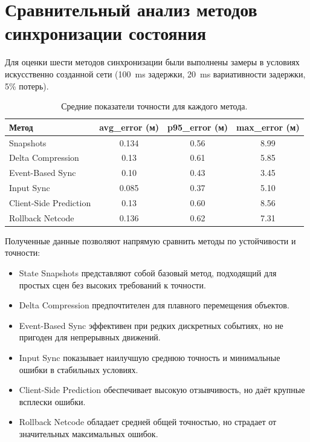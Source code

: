 \chapter{Сравнительный анализ методов синхронизации состояния}

Для оценки шести методов синхронизации были выполнены замеры в условиях
искусственно созданной сети (100~ms задержки, 20~ms вариативности задержки, 5\% потерь).

\begin{table}[h!]
    \centering
    \renewcommand{\arraystretch}{1.2}
    \begin{tabular}{|p{3.2cm}|c|c|c|}
        \hline
        Метод &
        avg\_error (м) &
        p95\_error (м) &
        max\_error (м) \\ \hline

        Snapshots &
        0.134 &
        0.56 &
        8.99 \\ \hline

        Delta Compression &
        0.13 &
        0.61 &
        5.85 \\ \hline

        Event-Based Sync &
        0.10 &
        0.43 &
        3.45 \\ \hline

        Input Sync &
        0.085 &
        0.37 &
        5.10 \\ \hline

        Client-Side Prediction &
        0.13 &
        0.60 &
        8.56 \\ \hline

        Rollback Netcode &
        0.136 &
        0.62 &
        7.31 \\ \hline
    \end{tabular}
    \caption{Средние показатели точности для каждого метода.}
\end{table}

Полученные данные позволяют напрямую сравнить методы по устойчивости и точности:
\begin{itemize}
    \item State Snapshots представляют собой базовый метод, подходящий для простых сцен без высоких требований к точности.
    \item Delta Compression предпочтителен для плавного перемещения объектов.  
    \item Event-Based Sync эффективен при редких дискретных событиях, но не пригоден для непрерывных движений.
    \item Input Sync показывает наилучшую среднюю точность и минимальные ошибки в стабильных условиях.
    \item Client-Side Prediction обеспечивает высокую отзывчивость, но даёт крупные всплески ошибки.
    \item Rollback Netcode обладает средней общей точностью, но страдает от значительных максимальных ошибок.
\end{itemize}